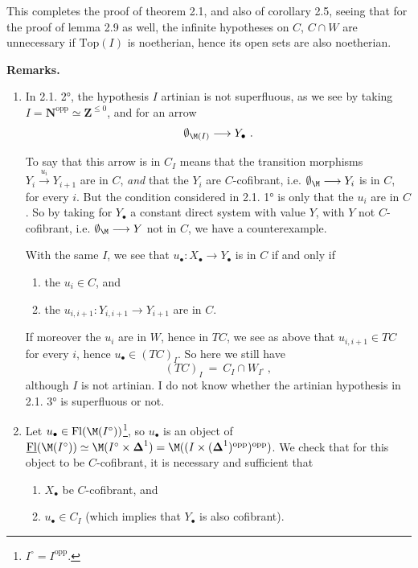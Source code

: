 This completes the proof of theorem 2.1, and also of corollary 2.5, seeing that for the proof of lemma 2.9 as well, the infinite hypotheses on $C$, $C \cap W$ are unnecessary if $\mathrm{Top}(I)$ is noetherian, hence its open sets are also noetherian.

\noindent\textbf{Remarks.}
\begin{enumerate}[leftmargin=2.5em]
\item[1)] In 2.1. 2°, the hypothesis $I$ artinian is not superfluous, as we see by taking $I = \mathbf{N}^{\mathrm{opp}} \simeq \mathbf{Z}^{\leq 0}$,  and for an arrow %
\[ \emptyset_{\M(I)} \longrightarrow Y_\bullet\ . \]

To say that this arrow is in $C_I$ means that the transition morphisms $Y_i \xrightarrow{u_i} Y_{i+1}$ are in $C$, \textit{and} that the $Y_i$ are $C$-cofibrant, i.e. $\emptyset_{\M} \longrightarrow Y_i$ is in $C$, for every $i$. But the condition considered in 2.1. 1° is only that the $u_i$ are in $C$. So by taking for $Y_\bullet$ a constant direct system with value $Y$, with $Y$ not $C$-cofibrant, i.e. $\emptyset_{\M} \longrightarrow Y$ not in $C$, we have a counterexample.

With the same $I$, we see that $u_\bullet : X_\bullet \longrightarrow Y_\bullet$ is in $C$ if and only if
\begin{enumerate}[leftmargin=2.5em]
\item[a)] the $u_i \in C$, and
\item[b)] the $u_{i,i+1} : Y_{i,i+1} \longrightarrow Y_{i+1}$ are in $C$.
\end{enumerate}


If moreover the $u_i$ are in $W$, hence in $TC$, we see as above that $u_{i,i+1} \in TC$ for every $i$, hence $u_\bullet \in (TC)_I$. So here we still have
\[ (TC)_I \ = \ C_I \cap W_{I^\circ}\ , \]
although $I$ is not artinian. I do not know whether the artinian hypothesis in 2.1. 3° is superfluous or not.
\item[2)] Let $u_\bullet \in \mathrm{Fl}(\M(I^\circ))$\footnote[13]{$I^\circ = I^{\mathrm{opp}}$.}, so $u_\bullet$ is an object of $\underline{\mathrm{Fl}}(\M(I^\circ)) \simeq \M(I^\circ \times \boldsymbol{\Delta}^1) = \M((I \times (\boldsymbol{\Delta}^1)^{\mathrm{opp}})^{\mathrm{opp}})$. We check that for this object to be $C$-cofibrant, it is necessary and sufficient that
\begin{enumerate}[leftmargin=2.5em]
\item[1°)] $X_\bullet$ be $C$-cofibrant, and
\item[2°)] $u_\bullet \in C_I$ (which implies that $Y_\bullet$ is also cofibrant).
\end{enumerate}
\end{enumerate}

